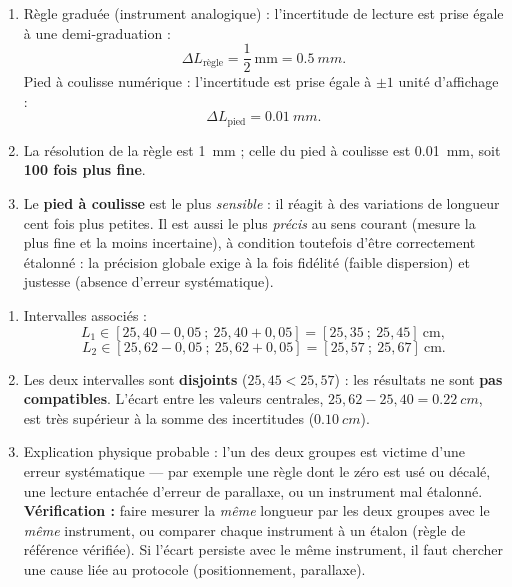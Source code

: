 \documentclass[11pt]{article}
\newcommand{\cle}[1]{{\popxbold\color{popdark}#1}}
\begin{document}
\begin{corrige}
\begin{enumerate}
\item Règle graduée (instrument analogique) : l'incertitude de lecture est prise égale à une demi-graduation :
\[ \Delta L_{\text{règle}} = \frac{1}{2}~\text{mm} = \SI{0,5}{mm}. \]
Pied à coulisse numérique : l'incertitude est prise égale à $\pm 1$ unité d'affichage :
\[ \Delta L_{\text{pied}} = \SI{0,01}{mm}. \]
\item La résolution de la règle est \SI{1}{mm} ; celle du pied à coulisse est \SI{0,01}{mm}, soit \textbf{100 fois plus fine}.
\item Le \textbf{pied à coulisse} est le plus \emph{sensible} : il réagit à des variations de longueur cent fois plus petites. Il est aussi le plus \emph{précis} au sens courant (mesure la plus fine et la moins incertaine), à condition toutefois d'être correctement étalonné : la précision globale exige à la fois fidélité (faible dispersion) et justesse (absence d'erreur systématique).
\end{enumerate}
\end{corrige}

\begin{corrige}
\begin{enumerate}
\item Intervalles associés :
\[ L_1 \in [25{,}40 - 0{,}05 \ ;\ 25{,}40 + 0{,}05] = [25{,}35 \ ;\ 25{,}45]~\text{cm}, \]
\[ L_2 \in [25{,}62 - 0{,}05 \ ;\ 25{,}62 + 0{,}05] = [25{,}57 \ ;\ 25{,}67]~\text{cm}. \]
\item Les deux intervalles sont \textbf{disjoints} ($25{,}45 < 25{,}57$) : les résultats ne sont \textbf{pas compatibles}. L'écart entre les valeurs centrales, $25{,}62 - 25{,}40 = \SI{0,22}{cm}$, est très supérieur à la somme des incertitudes ($\SI{0,10}{cm}$).
\item Explication physique probable : l'un des deux groupes est victime d'une \cle{erreur systématique} — par exemple une règle dont le zéro est usé ou décalé, une lecture entachée d'erreur de parallaxe, ou un instrument mal étalonné. \textbf{Vérification :} faire mesurer la \emph{même} longueur par les deux groupes avec le \emph{même} instrument, ou comparer chaque instrument à un étalon (règle de référence vérifiée). Si l'écart persiste avec le même instrument, il faut chercher une cause liée au protocole (positionnement, parallaxe).
\end{enumerate}
\end{corrige}
\end{document}
